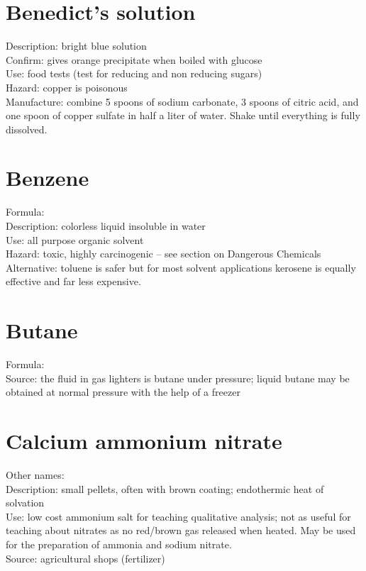 \section{Benedict's solution}
\label{sec:benedict}
Description: bright blue solution\\
Confirm: gives orange precipitate when boiled with glucose\\
Use: food tests (test for reducing and non reducing sugars)\\
Hazard: copper is poisonous\\
Manufacture: combine 5 spoons of sodium carbonate, 
3 spoons of citric acid, 
and one spoon of copper sulfate in half a liter of water. 
Shake until everything is fully dissolved.

\section{Benzene}
Formula: \\
Description: colorless liquid insoluble in water\\
Use: all purpose organic solvent\\
Hazard: toxic, 
highly carcinogenic -- see section on Dangerous Chemicals\\
Alternative: toluene is safer but for most solvent applications 
kerosene is equally effective and far less expensive.

\section{Butane}
Formula: \\
Source: the fluid in gas lighters is butane under pressure; 
liquid butane may be obtained at normal pressure with the help of a freezer

\section{Calcium ammonium nitrate}
Other names: \\
Description: small pellets, 
often with brown coating; 
endothermic heat of solvation\\
Use: low cost ammonium salt for teaching qualitative analysis; 
not as useful for teaching about nitrates 
as no red/brown gas released when heated. 
May be used for the preparation of ammonia and sodium nitrate.\\
Source: agricultural shops (fertilizer)\\

